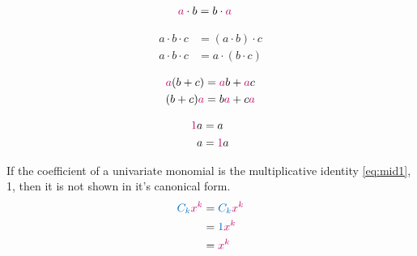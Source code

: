 \documentclass[20150903-160354-rs2.2-MarksMathNotebook.tex]{subfiles}
\begin{document}
\begin{property}
\begin{align}
\alert{a} \cdot b &= b \cdot \alert{a} \label{eq:cpm}
\end{align}
\end{property}

\begin{property}
\begin{subequations}
\begin{align}
a\cdot b\cdot c &= (a\cdot b)\cdot c \label{eq:apm1} \\
a\cdot b\cdot c &= a\cdot (b\cdot c) \label{eq:apm2}
\end{align}
\end{subequations}
\end{property}

\begin{property}
\begin{subequations}
\begin{align}
\alert{a}(b+c) &= \alert{a}b + \alert{a}c \label{eq:dpe1} \\
 (b+c)\alert{a} &= b\alert{a} + c\alert{a}  \label{eq:dpe2}
\end{align}
\end{subequations}
\end{property}

\begin{property}
\begin{subequations}
\begin{align}
\alert{1}a &= a \label{eq:mid1} \\
a &= \alert{1}a \label{eq:mid2}
\end{align}
\end{subequations}
\end{property}

\begin{remark}
If the coefficient of a univariate monomial is the multiplicative identity \ref{eq:mid1}, 1, then it is not shown in it's canonical form.
\begin{align*}
 \cBlue{C_{k}}\cRed{x^{k}}	& = \cBlue{C_{k}} \cRed{x^{k}} \\
 							& = \cBlue{1} \cRed{x^{k}} \\
                            & = \cRed{x^{k}}
\end{align*}
\end{remark}
\end{document}
